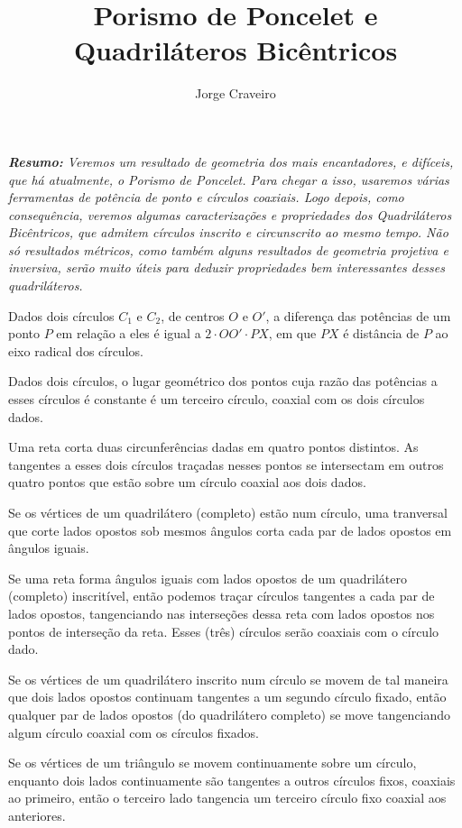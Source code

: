 \documentclass[10pt, a4paper]{article}
\title{Porismo de Poncelet e Quadriláteros Bicêntricos}
\author{Jorge Craveiro}
\begin{document}
	
	\zeustitle
	\begin{center}
		\begin{minipage}{0.9\textwidth}
			\itshape \textcolor{main}{\bfseries Resumo:} Veremos um resultado de geometria dos mais encantadores, e difíceis, que há atualmente, o Porismo de Poncelet. Para chegar a isso, usaremos várias ferramentas de potência de ponto e círculos coaxiais. Logo depois, como consequência, veremos algumas caracterizações e propriedades dos Quadriláteros Bicêntricos, que admitem círculos inscrito e circunscrito ao mesmo tempo. Não só resultados métricos, como também alguns resultados de geometria projetiva e inversiva, serão muito úteis para deduzir propriedades bem interessantes desses quadriláteros.
		\end{minipage}
	\end{center}
	\begin{prob}
		Dados dois círculos $C_1$ e $C_2$, de centros $O$ e $O'$, a diferença das potências de um ponto $P$ em relação a eles é igual a $2 \cdot OO' \cdot PX$, em que $PX$ é distância de $P$ ao eixo radical dos círculos.
	\end{prob}
	\begin{prob}
		Dados dois círculos, o lugar geométrico dos pontos cuja razão das potências a esses círculos é constante é um terceiro círculo, coaxial com os dois círculos dados.
	\end{prob}
	\begin{prob}
		Uma reta corta duas circunferências dadas em quatro pontos distintos. As tangentes a esses dois círculos traçadas nesses pontos se intersectam em outros quatro pontos que estão sobre um círculo coaxial aos dois dados.
	\end{prob}
	\begin{prob}
		Se os vértices de um quadrilátero (completo) estão num círculo, uma tranversal que corte lados opostos sob mesmos ângulos corta cada par de lados opostos em ângulos iguais.
	\end{prob}
	\begin{prob}
		Se uma reta forma ângulos iguais com lados opostos de um quadrilátero (completo) inscritível, então podemos traçar círculos tangentes a cada par de lados opostos, tangenciando nas interseções dessa reta com lados opostos nos pontos de interseção da reta. Esses (três) círculos serão coaxiais com o círculo dado.
	\end{prob}
	\begin{prob}
		Se os vértices de um quadrilátero inscrito num círculo se movem de tal maneira que dois lados opostos continuam tangentes a um segundo círculo fixado, então qualquer par de lados opostos (do quadrilátero completo) se move tangenciando algum círculo coaxial com os círculos fixados.
	\end{prob}
	\begin{prob}
		Se os vértices de um triângulo se movem continuamente sobre um círculo, enquanto dois lados continuamente são tangentes a outros círculos fixos, coaxiais ao primeiro, então o terceiro lado tangencia um terceiro círculo fixo coaxial aos anteriores.
	\end{prob}
\end{document}
